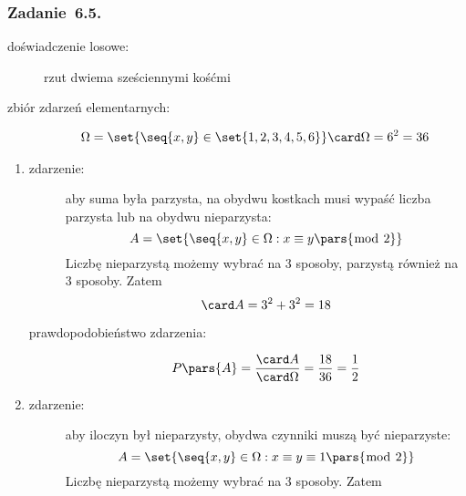 \subsubsection*{Zadanie~6.5.}
\begin{description}
    \item[doświadczenie losowe:] rzut dwiema sześciennymi kośćmi
    \item[zbiór zdarzeń elementarnych:]
        \begin{gather*}
            \Omega = \set{\seq{x, y} \in \set{1, 2, 3, 4, 5, 6}}
            \card\Omega = 6^2 = 36
        \end{gather*}
\end{description}
\begin{enumerate}[label={\alph*)}]
    \item
        \begin{description}
            \item[zdarzenie:] aby suma była parzysta, na obydwu kostkach musi wypaść liczba parzysta lub na obydwu nieparzysta:
                \begin{equation*}
                    A = \set{\seq{x, y} \in \Omega : x \equiv y \pars{\bmod\ 2}}
                \end{equation*}
                Liczbę nieparzystą możemy wybrać na \(3\) sposoby, parzystą również na \(3\) sposoby. Zatem
                \begin{equation*}
                    \card A = 3^2 + 3^2 = 18
                \end{equation*}
            \item[prawdopodobieństwo zdarzenia:]
                \begin{equation*}
                    P\pars{A}
                        = \frac{\card A}{\card \Omega}
                        = \frac{18}{36}
                        = \frac{1}{2}
                \end{equation*}
        \end{description}
    \item
        \begin{description}
            \item[zdarzenie:] aby iloczyn był nieparzysty, obydwa czynniki muszą być nieparzyste:
                \begin{equation*}
                    A = \set{\seq{x, y} \in \Omega : x \equiv y \equiv 1 \pars{\bmod\ 2}}
                \end{equation*}
                Liczbę nieparzystą możemy wybrać na \(3\) sposoby. Zatem

\end{description}
\end{enumerate}
